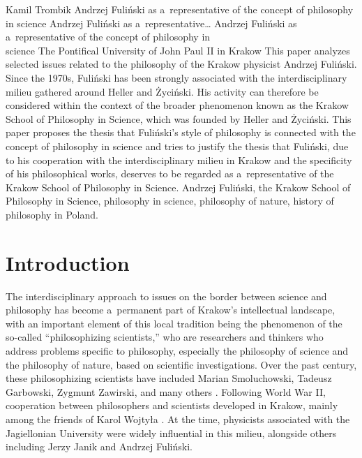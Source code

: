 \begin{artengenv}{Kamil Trombik}
	{Andrzej Fuliński as a~representative of the concept of philosophy in science}
	{Andrzej Fuliński as a~representative\ldots}
	{Andrzej Fuliński as a~representative of the concept of philosophy in\\science}
	{The Pontifical University of John Paul II in Krakow}
	{This paper analyzes selected issues related to the philosophy of the Krakow physicist Andrzej Fuliński. Since the 1970s, Fuliński has been strongly associated with the interdisciplinary milieu gathered around Heller and Życiński. His activity can therefore be considered within the context of the broader phenomenon known as the Krakow School of Philosophy in Science, which was founded by Heller and Życiński. This paper proposes the thesis that Fuliński's style of philosophy is connected with the concept of philosophy in science and tries to justify the thesis that Fuliński, due to his cooperation with the interdisciplinary milieu in Krakow and the specificity of his philosophical works, deserves to be regarded as a~representative of the Krakow School of Philosophy in Science.
	\enlargethispage{1.5\baselineskip}}
	{Andrzej Fuliński, the Krakow School of Philosophy in Science, philosophy in science, philosophy of nature, history of philosophy in Poland.}


\vspace{-1.5\baselineskip}

\section*{Introduction}

\lettrine[loversize=0.13,lines=2,lraise=-0.03,nindent=0em,findent=0.2pt]%
{T}{}he interdisciplinary approach to issues on the border between science and philosophy has become a~permanent part of Krakow's intellectual landscape, with an important element of this local tradition being the phenomenon of the so-called ``philosophizing scientists,'' who are researchers and thinkers who address problems specific to philosophy, especially the philosophy of science and the philosophy of nature, based on scientific investigations. Over the past century, these philosophizing scientists have included Marian Smoluchowski, Tadeusz Garbowski, Zygmunt Zawirski, and many others 
\parencites[see, for example,][]{heller_krakowska_2007}[][]{polak_u_2011}[][]{polak_19th_2011}[][]{polak_tradycja_2018}. %
 Following World War II, cooperation between philosophers and scientists developed in Krakow, mainly among the friends of Karol Wojtyła 
\parencites[][]{heller_poczatki_2006}[][]{trombik_koncepcje_2021}[][]{trombik_stworzyc_2022}. %
 At the time, physicists associated with the Jagiellonian University were widely influential in this milieu, alongside others including Jerzy Janik and Andrzej Fuliński.




\end{artengenv}
